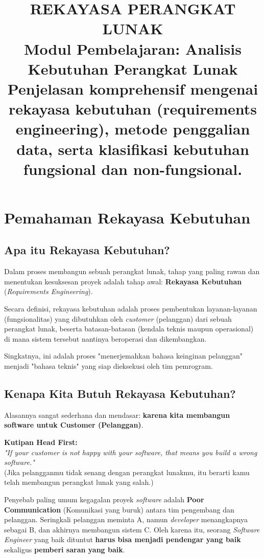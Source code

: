 \documentclass[12pt,a4paper]{article}
\title{
  {\LARGE\bfseries REKAYASA PERANGKAT LUNAK}\\[0.5em]
  {\large Modul Pembelajaran: Analisis Kebutuhan Perangkat Lunak}\\[0.8em]
  {\normalsize Penjelasan komprehensif mengenai rekayasa kebutuhan (requirements engineering), metode penggalian data, serta klasifikasi kebutuhan fungsional dan non-fungsional.}
}
\author{}
\date{}
\begin{document}
\maketitle
\thispagestyle{fancy}
\tableofcontents
\newpage


\section{Pemahaman Rekayasa Kebutuhan}

\subsection{Apa itu Rekayasa Kebutuhan?}
Dalam proses membangun sebuah perangkat lunak, tahap yang paling rawan dan menentukan kesuksesan proyek adalah tahap awal: \textbf{Rekayasa Kebutuhan} (\textit{Requirements Engineering}). 

Secara definisi, rekayasa kebutuhan adalah proses pembentukan layanan-layanan (fungsionalitas) yang dibutuhkan oleh \textit{customer} (pelanggan) dari sebuah perangkat lunak, beserta batasan-batasan (kendala teknis maupun operasional) di mana sistem tersebut nantinya beroperasi dan dikembangkan. 

Singkatnya, ini adalah proses "menerjemahkan bahasa keinginan pelanggan" menjadi "bahasa teknis" yang siap dieksekusi oleh tim pemrogram.

\subsection{Kenapa Kita Butuh Rekayasa Kebutuhan?}
Alasannya sangat sederhana dan mendasar: \textbf{karena kita membangun software untuk Customer (Pelanggan)}. 

\begin{notebox}
\textbf{Kutipan Head First:}\\
\textit{"If your customer is not happy with your software, that means you build a wrong software."} \\
(Jika pelangganmu tidak senang dengan perangkat lunakmu, itu berarti kamu telah membangun perangkat lunak yang salah.)
\end{notebox}

Penyebab paling umum kegagalan proyek \textit{software} adalah \textbf{Poor Communication} (Komunikasi yang buruk) antara tim pengembang dan pelanggan. Seringkali pelanggan meminta A, namun \textit{developer} menangkapnya sebagai B, dan akhirnya membangun sistem C. Oleh karena itu, seorang \textit{Software Engineer} yang baik dituntut \textbf{harus bisa menjadi pendengar yang baik} sekaligus \textbf{pemberi saran yang baik}. 
\end{document}
